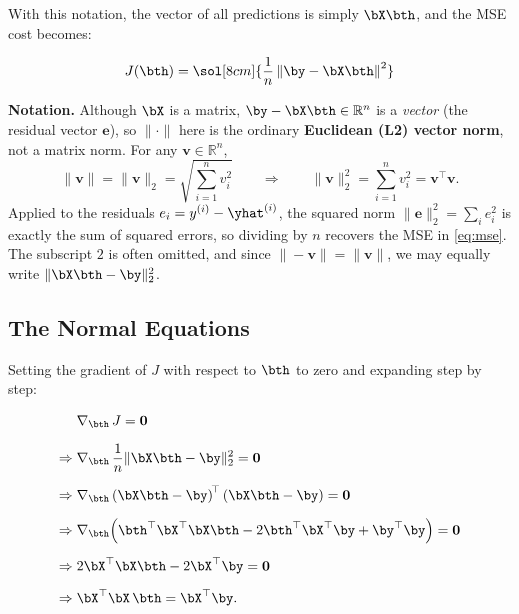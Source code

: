 \documentclass[12pt, a4paper]{article}
\begin{document}
With this notation, the vector of all predictions is simply $\bX\bth$, and the
MSE cost becomes:

\[
  J(\bth) = \sol[8cm]{\frac{1}{n}\left\|\by - \bX\bth\right\|^2}
\]

\begin{notebox}
  \textbf{Notation.} Although $\bX$ is a matrix, $\by - \bX\bth \in \mathbb{R}^n$
  is a \emph{vector} (the residual vector $\mathbf{e}$), so $\|\cdot\|$ here is
  the ordinary \textbf{Euclidean (L2) vector norm}, not a matrix norm. For any
  $\mathbf{v} \in \mathbb{R}^n$,
  \[
    \|\mathbf{v}\| = \|\mathbf{v}\|_2 = \sqrt{\sum_{i=1}^{n} v_i^2}
    \qquad \Longrightarrow \qquad
    \|\mathbf{v}\|_2^2 = \sum_{i=1}^{n} v_i^2 = \mathbf{v}^\top\mathbf{v}.
  \]
  Applied to the residuals $e_i = y^{(i)} - \yhat^{(i)}$, the squared norm
  $\|\mathbf{e}\|_2^2 = \sum_i e_i^2$ is exactly the sum of squared errors, so
  dividing by $n$ recovers the MSE in \eqref{eq:mse}. The subscript $2$ is often
  omitted, and since $\|-\mathbf{v}\| = \|\mathbf{v}\|$, we may equally write
  $\|\bX\bth - \by\|_2^2$.
\end{notebox}

\subsection{The Normal Equations}

Setting the gradient of $J$ with respect to $\bth$ to zero and expanding
step by step:

\begin{align*}
                & \nabla_{\bth}\, J = \mathbf{0}               \\[6pt]
  \Rightarrow\; &
  \nabla_{\bth}\,\frac{1}{n}\|\bX\bth - \by\|_2^2 = \mathbf{0} \\[6pt]
  \Rightarrow\; &
  \nabla_{\bth}
  \left(\bX\bth - \by\right)^{\!\top}
  \left(\bX\bth - \by\right) = \mathbf{0}                      \\[6pt]
  \Rightarrow\; &
  \nabla_{\bth}\!\left(
  \bth^{\top}\bX^{\top}\bX\bth
  - 2\bth^{\top}\bX^{\top}\by
  + \by^{\top}\by
  \right) = \mathbf{0}                                         \\[6pt]
  \Rightarrow\; &
  2\bX^{\top}\bX\bth - 2\bX^{\top}\by = \mathbf{0}             \\[6pt]
  \Rightarrow\; &
  \bX^{\top}\bX\,\bth = \bX^{\top}\by.
\end{align*}
\end{document}
